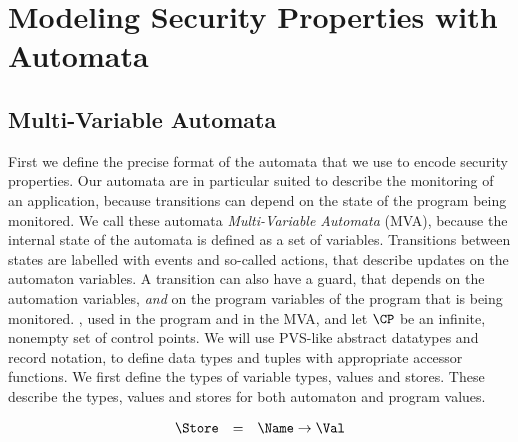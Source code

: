 \section{Modeling Security Properties with Automata}\label{SecMVA}

\subsection{Multi-Variable Automata}
First we define the precise format of the automata that we use to
encode security properties. Our automata are in particular suited to
describe the monitoring of an application, because transitions can
depend on the state of the program being monitored. We call these
automata \emph{Multi-Variable Automata} (MVA), because the internal
state of the automata is defined as a set of variables. Transitions
between states are labelled with events and so-called actions, that
describe updates on the automaton variables. A transition can also
have a guard, that depends on the automation variables, \emph{and} on
the program variables of the program that is being monitored.
, used in the
program and in the MVA, and let \(\CP\) be an infinite, nonempty set
of control points. 
We will use PVS-like abstract datatypes and record notation, to define
data types and tuples with appropriate accessor functions. We first
define the types of variable types, values and stores. These describe
the types, values and stores for both automaton and program values.

\[
\begin{array}{rcl}
\Store & = & \Name \rightarrow \Val
\end{array}
\]

